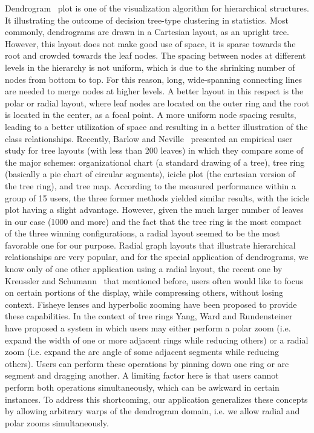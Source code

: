 Dendrogram~\cite{Dendrogram} plot is one of the visualization algorithm for hierarchical structures. It illustrating the outcome of decision tree-type clustering in statistics.
Most commonly, dendrograms are drawn in a Cartesian layout, as an upright tree. However, this layout does not make good use of space, it is sparse towards the root and crowded towards the leaf nodes.
The spacing between nodes at different levels in the hierarchy is not uniform, which is due to the shrinking number of nodes from bottom to top. For this reason, long, wide-spanning connecting lines are needed to merge nodes at higher levels.
A better layout in this respect is the polar or radial layout, where leaf nodes are located on the outer ring and the root is located in the center, as a focal point.
A more uniform node spacing results, leading to a better utilization of space and resulting in a better illustration of the class relationships.
Recently, Barlow and Neville~\cite{Barlow_Neville} presented an empirical user study for tree layouts (with less than 200 leaves) in which they compare some of the major schemes: organizational chart (a standard drawing of a tree),
tree ring (basically a pie chart of circular segments), icicle plot (the cartesian version of the tree ring), and tree map. According to the measured performance within a group of 15 users,
the three former methods yielded similar results, with the icicle plot having a slight advantage. However, given the much larger number of leaves in our case (1000 and more) and the fact that the tree ring is the most compact of the three winning configurations,
a radial layout seemed to be the most favorable one for our purpose. Radial graph layouts that illustrate hierarchical relationships are very popular, and for the special application of dendrograms,
we know only of one other application using a radial layout, the recent one by Kreussler and Schumann~\cite{Kreussler_Schumann} that mentioned before, users often would like to focus on certain portions of the display,
while compressing others, without losing context. Fisheye lenses and hyperbolic zooming have been proposed to provide these capabilities.
In the context of tree rings Yang, Ward and Rundensteiner~\cite{Yang_Ward} have proposed a system in which users may either perform a polar zoom (i.e. expand the width of one or more adjacent rings while reducing others) or
a radial zoom (i.e. expand the arc angle of some adjacent segments while reducing others). Users can perform these operations by pinning down one ring or arc segment and dragging another.
A limiting factor here is that users cannot perform both operations simultaneously, which can be awkward in certain instances. To address this shortcoming,
our application generalizes these concepts by allowing arbitrary warps of the dendrogram domain, i.e. we allow radial and polar zooms simultaneously.



